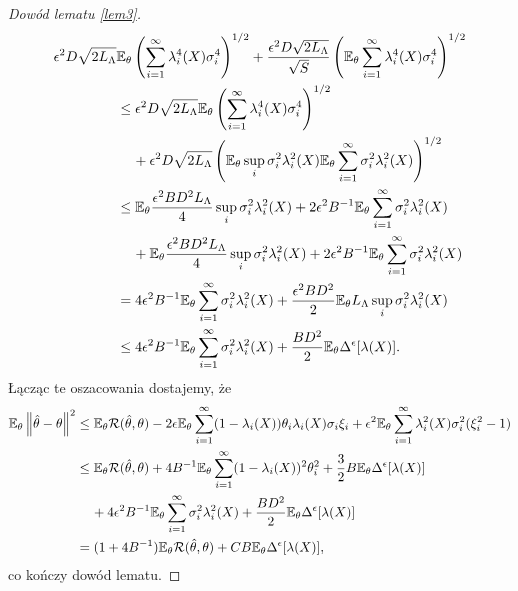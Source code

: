 \documentclass[man,mfiu]{mgrwms}
\newcommand{\norm}[1]{\left\lVert#1\right\rVert}
\begin{document}
\begin{proof}[Dowód lematu \ref{lem3}]
\begin{displaymath}
\begin{split}
\epsilon^2D\sqrt{2L_{\Lambda}}&\mathbb{E}_{\theta}\left(\sum_{i=1}^{\infty}\lambda_i^4(X)\sigma_i^4\right)^{1/2}+\frac{\epsilon^2D\sqrt{2L_{\Lambda}}}{\sqrt{S}}\left(\mathbb{E}_{\theta}\sum_{i=1}^{\infty}\lambda_i^4(X)\sigma_i^4\right)^{1/2}\\
&\leq \epsilon^2D\sqrt{2L_{\Lambda}}\mathbb{E}_{\theta}\left(\sum_{i=1}^{\infty}\lambda_i^4(X)\sigma_i^4\right)^{1/2}\\
&\hspace{4mm}+\epsilon^2D\sqrt{2L_{\Lambda}}\left(\mathbb{E}_{\theta}\sup_i\sigma_i^2\lambda_i^2(X)\mathbb{E}_{\theta}\sum_{i=1}^{\infty}\sigma_i^2\lambda_i^2(X)\right)^{1/2}\\
&\leq \mathbb{E}_{\theta}\frac{\epsilon^2BD^2L_{\Lambda}}{4}\sup_i\sigma_i^2\lambda_i^2(X)+2\epsilon^2B^{-1}\mathbb{E}_{\theta}\sum_{i=1}^{\infty}\sigma_i^2\lambda_i^2(X)\\
&\hspace{4mm}+\mathbb{E}_{\theta}\frac{\epsilon^2BD^2L_{\Lambda}}{4}\sup_i\sigma_i^2\lambda_i^2(X)+2\epsilon^2B^{-1}\mathbb{E}_{\theta}\sum_{i=1}^{\infty}\sigma_i^2\lambda_i^2(X)\\
&=4\epsilon^2B^{-1}\mathbb{E}_{\theta}\sum_{i=1}^{\infty}\sigma_i^2\lambda_i^2(X)+\frac{\epsilon^2BD^2}{2}\mathbb{E}_{\theta}L_{\Lambda}\sup_i\sigma_i^2\lambda_i^2(X)\\
&\leq 4\epsilon^2B^{-1}\mathbb{E}_{\theta}\sum_{i=1}^{\infty}\sigma_i^2\lambda_i^2(X)+\frac{BD^2}{2}\mathbb{E}_{\theta}\Delta^{\epsilon}[\lambda(X)].
\end{split}
\end{displaymath}
Łącząc te oszacowania dostajemy, że
\begin{displaymath}
\begin{split}
\mathbb{E}_{\theta}\norm{\hat{\theta}-\theta}^2&\leq \mathbb{E}_{\theta}\mathcal{R}(\hat{\theta},\theta)-2\epsilon\mathbb{E}_{\theta}\sum_{i=1}^{\infty}(1-\lambda_i(X))\theta_i\lambda_i(X)\sigma_i\xi_i+\epsilon^2\mathbb{E}_{\theta}\sum_{i=1}^{\infty}\lambda_i^2(X)\sigma_i^2(\xi^2_i-1)\\
&\leq \mathbb{E}_{\theta}\mathcal{R}(\hat{\theta},\theta)+4B^{-1}\mathbb{E}_{\theta}\sum_{i=1}^{\infty}(1-\lambda_i(X))^2\theta_i^2+\frac{3}{2}B\mathbb{E}_{\theta}\Delta^{\epsilon}[\lambda(X)]\\
&\hspace{4mm}+4\epsilon^2B^{-1}\mathbb{E}_{\theta}\sum_{i=1}^{\infty}\sigma_i^2\lambda_i^2(X)+\frac{BD^2}{2}\mathbb{E}_{\theta}\Delta^{\epsilon}[\lambda(X)]\\
&=(1+4B^{-1})\mathbb{E}_{\theta}\mathcal{R}(\hat{\theta},\theta)+CB\mathbb{E}_{\theta}\Delta^{\epsilon}[\lambda (X)],
\end{split}
\end{displaymath}
co kończy dowód lematu.
\end{proof}
\end{document}
